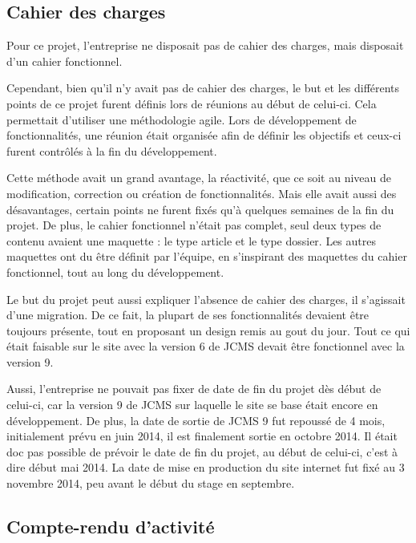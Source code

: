 \documentclass[12pt,a4paper]{article}
\begin{document}
\subsection{Cahier des charges}
Pour ce projet, l'entreprise ne disposait pas de cahier des charges, mais disposait d'un cahier fonctionnel.\par
Cependant, bien qu'il n'y avait pas de cahier des charges, le but et les différents points de ce projet furent définis lors de réunions au début de celui-ci. Cela permettait d'utiliser une méthodologie agile. Lors de développement de fonctionnalités, une réunion était organisée afin de définir les objectifs et ceux-ci furent contrôlés à la fin du développement.\par 
Cette méthode avait un grand avantage, la réactivité, que ce soit au niveau de modification, correction ou création de fonctionnalités. Mais elle avait aussi des désavantages, certain points ne furent fixés qu'à quelques semaines de la fin du projet. De plus, le cahier fonctionnel n'était pas complet, seul deux types de contenu avaient une maquette : le type article et le type dossier. Les autres maquettes ont du être définit par l'équipe, en s'inspirant des maquettes du cahier fonctionnel, tout au long du développement. \par 
Le but du projet peut aussi expliquer l'absence de cahier des charges, il s'agissait d'une migration. De ce fait, la plupart de ses fonctionnalités devaient être toujours présente, tout en proposant un design remis au gout du jour. Tout ce qui était faisable sur le site avec la version 6 de \gls{JCMS} devait être fonctionnel avec la version 9.\par 
Aussi, l'entreprise ne pouvait pas fixer de date de fin du projet dès début de celui-ci, car la version 9 de \gls{JCMS} sur laquelle le site se base était encore en développement. De plus, la date de sortie de \gls{JCMS} 9 fut repoussé de 4 mois, initialement prévu en juin 2014, il est finalement sortie en octobre 2014. Il était doc pas possible de prévoir le date de fin du projet, au début de celui-ci, c'est à dire début mai 2014. La date de mise en production du site internet fut fixé au 3 novembre 2014, peu avant le début du stage en septembre.\par
\subsection{Compte-rendu d'activité}
\end{document}
